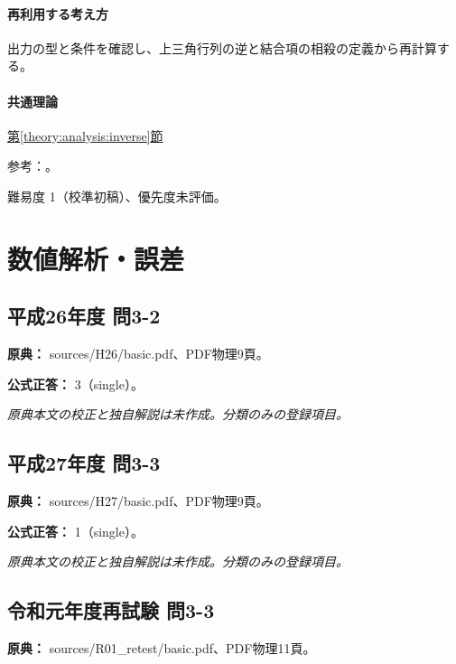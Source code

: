 \paragraph{再利用する考え方} 出力の型と条件を確認し、上三角行列の逆と結合項の相殺の定義から再計算する。

\paragraph{共通理論} \hyperref[theory:analysis:inverse]{第\ref*{theory:analysis:inverse}節}

\par 参考：\cite{mit_inverse2007}。

\par 難易度 1（校準初稿）、優先度未評価。

\section{数値解析・誤差}

\subsection{平成26年度 問3-2}
\label{q:h26-reg-basic-3-2}

\noindent\textbf{原典：} sources/H26/basic.pdf、PDF物理9頁。

\textbf{公式正答：} 3（single）。

\par\textit{原典本文の校正と独自解説は未作成。分類のみの登録項目。}

\subsection{平成27年度 問3-3}
\label{q:h27-reg-basic-3-3}

\noindent\textbf{原典：} sources/H27/basic.pdf、PDF物理9頁。

\textbf{公式正答：} 1（single）。

\par\textit{原典本文の校正と独自解説は未作成。分類のみの登録項目。}

\subsection{令和元年度再試験 問3-3}
\label{q:r01-ret-basic-3-3}

\noindent\textbf{原典：} sources/R01\_retest/basic.pdf、PDF物理11頁。

